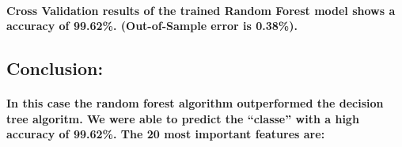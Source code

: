\documentclass[]{article}
\newenvironment{Shaded}{\begin{snugshade}}{\end{snugshade}}
\newcommand{\KeywordTok}[1]{\textcolor[rgb]{0.13,0.29,0.53}{\textbf{#1}}}
\newcommand{\DecValTok}[1]{\textcolor[rgb]{0.00,0.00,0.81}{#1}}
\newcommand{\StringTok}[1]{\textcolor[rgb]{0.31,0.60,0.02}{#1}}
\newcommand{\OperatorTok}[1]{\textcolor[rgb]{0.81,0.36,0.00}{\textbf{#1}}}
\newcommand{\NormalTok}[1]{#1}
\let\oldparagraph\paragraph
\renewcommand{\paragraph}[1]{\oldparagraph{#1}\mbox{}}
\begin{document}
\begin{Shaded}
\end{Shaded}

\paragraph{Cross Validation results of the trained Random Forest model
shows a accuracy of 99.62\%. (Out-of-Sample error is
0.38\%).}\label{cross-validation-results-of-the-trained-random-forest-model-shows-a-accuracy-of-99.62.-out-of-sample-error-is-0.38.}

\subsection{Conclusion:}\label{conclusion}

\paragraph{\texorpdfstring{In this case the random forest algorithm
outperformed the decision tree algoritm. We were able to predict the
``classe'' with a high accuracy of 99.62\%. The 20 most important
features
are:}{In this case the random forest algorithm outperformed the decision tree algoritm. We were able to predict the classe with a high accuracy of 99.62\%. The 20 most important features are:}}\label{in-this-case-the-random-forest-algorithm-outperformed-the-decision-tree-algoritm.-we-were-able-to-predict-the-classe-with-a-high-accuracy-of-99.62.-the-20-most-important-features-are}
\end{document}

